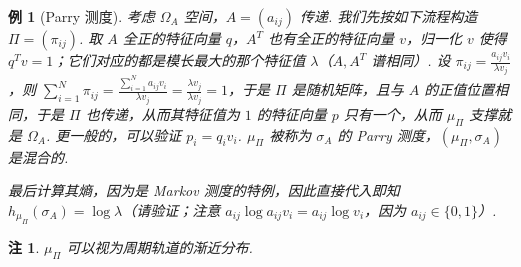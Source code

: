 \documentclass[11pt, a4paper, oneside]{ctexart}
\newtheorem{example}[theorem]{例}
\newtheorem{remark}[theorem]{注}
\begin{document}
    \begin{example}[Parry 测度]
        考虑 $\Omega_A$ 空间，$A=(a_{ij})$ 传递. 我们先按如下流程构造 $\Pi=(\pi_{ij})$. 取 $A$ 全正的特征向量 $q$，$A^T$ 也有全正的特征向量 $v$，归一化 $v$ 使得 $q^T v=1$；它们对应的都是模长最大的那个特征值 $\lambda$（$A,A^T$ 谱相同）. 设 $\pi_{ij}=\frac{a_{ij}v_i}{\lambda v_j}$，则 $\sum\limits_{i=1}^{N}\pi_{ij}=\frac{\sum\limits_{i=1}^{N}a_{ij}v_i}{\lambda v_j}=\frac{\lambda v_j}{\lambda v_j}=1$，于是 $\Pi$ 是随机矩阵，且与 $A$ 的正值位置相同，于是 $\Pi$ 也传递，从而其特征值为 $1$ 的特征向量 $p$ 只有一个，从而 $\mu_{\Pi}$ 支撑就是 $\Omega_A$. 更一般的，可以验证 $p_i=q_i v_i$. $\mu_{\Pi}$ 被称为 $\sigma_A$ 的 Parry 测度，$(\mu_{\Pi},\sigma_A)$ 是混合的.

        最后计算其熵，因为是 Markov 测度的特例，因此直接代入即知 $h_{\mu_{\Pi}}(\sigma_A)=\log \lambda$（请验证；注意 $a_{ij}\log a_{ij}v_i=a_{ij}\log v_i$，因为 $a_{ij}\in\{0,1\}$）.
    \end{example}
    \begin{remark}
        $\mu_{\Pi}$ 可以视为周期轨道的渐近分布.
    \end{remark}
\end{document}
